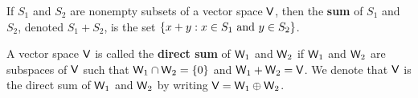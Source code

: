\begin{defn}\label{1.3.10}
  If \(S_{1}\) and \(S_{2}\) are nonempty subsets of a vector space \(\mathsf{V}\), then the \textbf{sum} of \(S_{1}\) and \(S_{2}\), denoted \(S_{1} + S_{2}\), is the set \(\left\lbrace x + y : x \in S_{1} \text{ and } y \in S_{2}\right\rbrace\).
\end{defn}

\begin{defn}\label{1.3.11}
  A vector space \(\mathsf{V}\) is called the \textbf{direct sum} of \(\mathsf{W}_{1}\) and \(\mathsf{W}_{2}\) if \(\mathsf{W}_{1}\) and \(\mathsf{W}_{2}\) are subspaces of \(\mathsf{V}\) such that \(\mathsf{W}_{1} \cap \mathsf{W}_{2} = \left\lbrace0\right\rbrace\) and \(\mathsf{W}_{1} + \mathsf{W}_{2} = \mathsf{V}\).
  We denote that \(\mathsf{V}\) is the direct sum of \(\mathsf{W}_{1}\) and \(\mathsf{W}_{2}\) by writing \(\mathsf{V} = \mathsf{W}_{1} \oplus \mathsf{W}_{2}\).
\end{defn}
